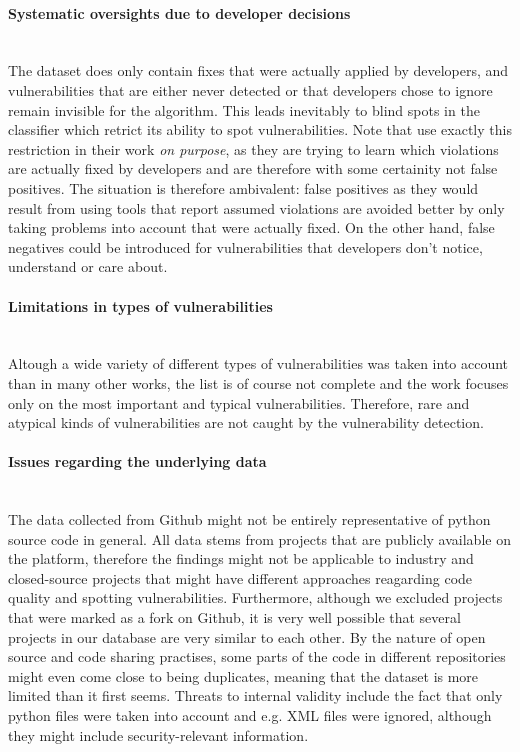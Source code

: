 \documentclass[
	a4paper,
	pagesize,
	pdftex,
	12pt,
	twoside, %
	BCOR=5mm, %
	ngerman,
	fleqn,
	final,
	]{scrartcl}
\begin{document}
\paragraph{Systematic oversights due to developer decisions}\mbox{}\\
The dataset does only contain fixes that were actually applied by developers, and vulnerabilities that are either never detected or that developers chose to ignore remain invisible for the algorithm. This leads inevitably to blind spots in the classifier which retrict its ability to spot vulnerabilities. Note that \cite{Liu.2018} use exactly this restriction in their work \textit{on purpose}, as they are trying to learn which violations are actually fixed by developers and are therefore with some certainity not false positives. The situation is therefore ambivalent: false positives as they would result from using tools that report assumed violations are avoided better by only taking problems into account that were actually fixed. On the other hand, false negatives could be introduced for vulnerabilities that developers don't notice, understand or care about.
\paragraph{Limitations in types of vulnerabilities}\mbox{}\\
Altough a wide variety of different types of vulnerabilities was taken into account than in many other works, the list is of course not complete and the work focuses only on the most important and typical vulnerabilities. Therefore, rare and atypical kinds of vulnerabilities are not caught by the vulnerability detection.
\paragraph{Issues regarding the underlying data}\mbox{}\\
The data collected from Github might not be entirely representative of python source code in general. All data stems from projects that are publicly available on the platform, therefore the findings might not be applicable to industry and closed-source projects that might have different approaches reagarding code quality and spotting vulnerabilities. Furthermore, although we excluded projects that were marked as a fork on Github, it is very well possible that several projects in our database are very similar to each other. By the nature of open source and code sharing practises, some parts of the code in different repositories might even come close to being duplicates, meaning that the dataset is more limited than it first seems. Threats to internal validity include the fact that only python files were taken into account and e.g. XML files were ignored, although they might include security-relevant information. 
\end{document}

